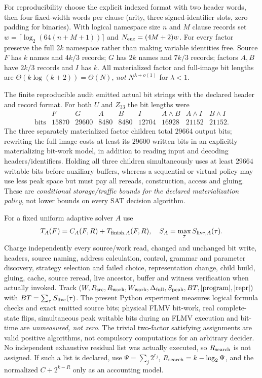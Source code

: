 \documentclass[11pt]{article}
\begin{document}
For reproducibility choose the explicit indexed format with two header words, then four fixed-width words per clause (arity, three signed-identifier slots, zero padding for binaries). With logical namespace size $n$ and $M$ clause records set $w=\lceil\log_2(64(n+M+1))\rceil$ and $N_{\rm enc}=(4M+2)w$. For every factor preserve the full $2k$ namespace rather than making variable identities free. Source $F$ has $k$ names and $4k/3$ records; $G$ has $2k$ names and $7k/3$ records; factors $A,B$ have $2k/3$ records and $I$ has $k$. All materialized factor and full-image bit lengths are $\Theta(k\log(k+2))=\Theta(N)$, \emph{not} $N^{\lambda+o(1)}$ for $\lambda<1$.

The finite reproducible audit emitted actual bit strings with the declared header and record format. For both $U$ and $Z_{33}$ the bit lengths were
\[
\begin{array}{c|rrrrrrrr}
&F&G&A&B&I&A\land B&A\land I&B\land I\\ \hline
\text{bits}&15870&29600&8480&8480&12704&16928&21152&21152.
\end{array}
\]
The three separately materialized factor children total $29664$ output bits; rewriting the full image costs at least its $29600$ written bits in an explicitly materializing bit-work model, in addition to reading input and decoding headers/identifiers. Holding all three children simultaneously uses at least $29664$ writable bits before auxiliary buffers, whereas a sequential or virtual policy may use less peak space but must pay all rereads, construction, access and gluing. These are \emph{conditional storage/traffic bounds for the declared materialization policy}, not lower bounds on every SAT decision algorithm.

For a fixed uniform adaptive solver $A$ use
\[
T_A(F)=C_A(F,R)+T_{{\rm finish},A}(F,R),\quad
S_A=\max_\tau S_{{\rm live},A}(\tau).
\]
Charge independently every source/work read, changed and unchanged bit write, headers, source naming, address calculation, control, grammar and parameter discovery, strategy selection and failed choice, representation change, child build, gluing, cache, source reread, live ancestor, buffer and witness verification when actually invoked. Track $(W,R_{\rm src},R_{\rm work},W_{\rm work},\Delta_{\rm full},S_{\rm peak},BT,|\mathrm{program}|,|\mathrm{repr}|)$ with $BT=\sum_\tau S_{\rm live}(\tau)$. The present Python experiment measures logical formula checks and exact emitted source bits; physical FLMV bit-work, real complete-state flips, simultaneous peak writable bits during an FLMV execution and bit-time are \emph{unmeasured, not zero}. The trivial two-factor satisfying assignments are valid positive algorithms, not compulsory computations for an arbitrary decider. No independent exhaustive residual list was actually executed, so $R_{\rm search}$ is not assigned. If such a list is declared, use $\Psi=\sum_j2^{r_j}$, $R_{\rm search}=k-\log_2\Psi$, and the normalized $C+2^{k-R}$ only as an accounting model.
\end{document}
